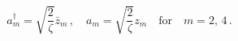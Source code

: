 \begin{equation} 
a^{\dagger}_m=\sqrt{\frac{2}{\zeta}}\bar{z}_m\,,\quad 
 a_m=\sqrt{\frac{2}{\zeta}} z_m\quad
\textrm{for}\quad m=2,\,4\,.\label{eq:4.0.4}
\end{equation}

